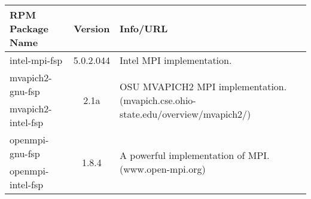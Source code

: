 \small
\begin{tabularx}{\textwidth}{l|c|X}
\toprule
{\bf RPM Package Name} & {\bf Version} & {\bf Info/URL}  \\ 
\midrule

\multirow{2}{*}{intel-mpi-fsp} & 
\multirow{2}{*}{5.0.2.044} & 
\multirow{2}{*}{Intel MPI implementation.} \\
& & 
\\ \hline 

mvapich2-gnu-fsp & 
\multirow{2}{*}{2.1a} & 
\multirow{2}{\linewidth}{OSU MVAPICH2 MPI implementation. \newline (mvapich.cse.ohio-state.edu/overview/mvapich2/)} \\ 
mvapich2-intel-fsp & 
& \\ 
\hline

openmpi-gnu-fsp & 
\multirow{2}{*}{1.8.4} & 
\multirow{2}{\linewidth}{A powerful implementation of MPI. \newline (www.open-mpi.org)} \\ 
openmpi-intel-fsp & 
& \\ 
\hline

\bottomrule
\end{tabularx}
